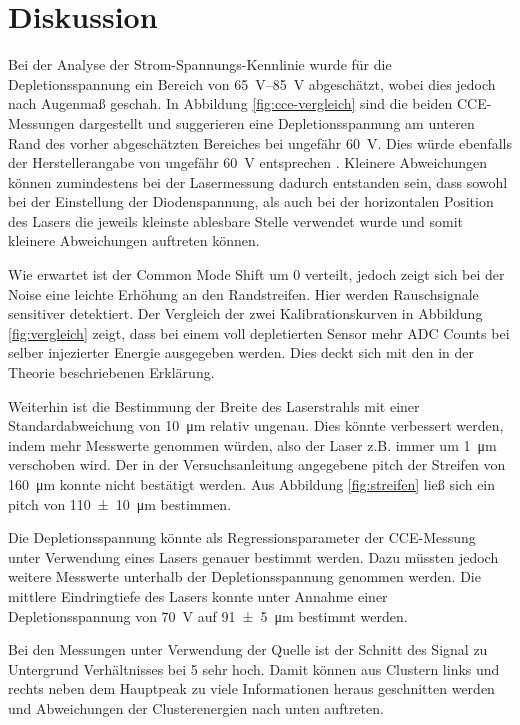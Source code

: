 \section{Diskussion}
\label{sec:Diskussion}

Bei der Analyse der Strom-Spannungs-Kennlinie wurde für die Depletionsspannung ein
Bereich von \SIrange{65}{85}{\volt} abgeschätzt, wobei dies jedoch nach Augenmaß
geschah. In Abbildung \ref{fig:cce-vergleich} sind die beiden CCE-Messungen dargestellt
und suggerieren eine Depletionsspannung am unteren Rand des vorher abgeschätzten Bereiches
bei ungefähr \SI{60}{\volt}.
Dies würde ebenfalls der Herstellerangabe von ungefähr \SI{60}{\volt} entsprechen \cite{alibava}.
Kleinere Abweichungen können zumindestens bei der Lasermessung dadurch entstanden sein,
dass sowohl bei der Einstellung der Diodenspannung, als auch bei der horizontalen
Position des Lasers die jeweils kleinste ablesbare Stelle verwendet wurde und somit
kleinere Abweichungen auftreten können.

Wie erwartet ist der Common Mode Shift um \num{0} verteilt, jedoch zeigt sich bei
der Noise eine leichte Erhöhung an den Randstreifen. Hier werden Rauschsignale
sensitiver detektiert.
Der Vergleich der zwei Kalibrationskurven in Abbildung \ref{fig:vergleich} zeigt,
dass bei einem voll depletierten Sensor mehr ADC Counts bei selber injezierter
Energie ausgegeben werden. Dies deckt sich mit den in der Theorie beschriebenen
Erklärung.

Weiterhin ist die Bestimmung der Breite des Laserstrahls mit einer Standardabweichung
von \SI{10}{\micro\meter} relativ ungenau. Dies könnte verbessert werden, indem
mehr Messwerte genommen würden, also der Laser z.B. immer um \SI{1}{\micro\meter}
verschoben wird.
Der in der Versuchsanleitung angegebene pitch der Streifen von \SI{160}{\micro\meter}
\cite[13]{anleitung} konnte nicht bestätigt werden. Aus Abbildung \ref{fig:streifen}
ließ sich ein pitch von \SI{110(10)}{\micro\meter} bestimmen.

Die Depletionsspannung könnte als Regressionsparameter der CCE-Messung unter Verwendung
eines Lasers genauer bestimmt werden. Dazu müssten jedoch weitere Messwerte
unterhalb der Depletionsspannung genommen werden.
Die mittlere Eindringtiefe des Lasers konnte unter Annahme einer Depletionsspannung
von \SI{70}{\volt} auf \SI{91(5)}{\micro\meter} bestimmt werden.

Bei den Messungen unter Verwendung der Quelle ist der Schnitt des Signal zu Untergrund
Verhältnisses bei \num{5} sehr hoch. Damit können aus Clustern links und rechts neben dem
Hauptpeak zu viele Informationen heraus geschnitten werden und Abweichungen der
Clusterenergien nach unten auftreten.

